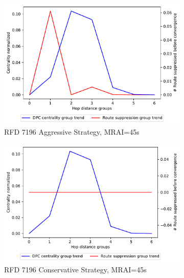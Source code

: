 \begin{figure}[H]
\begin{subfigure}[b]{0.325\textwidth}
         \centering
         \includegraphics[width=\textwidth]{images/RFD/miceVSelephants/MultiMRAI/45/mice/cisco_1000_RFD_7196_aggressive_nodeConvergence_centVSsup_trend.pdf}
         \caption{RFD 7196 Aggressive Strategy, MRAI=45s}
         \label{fig:1000_7196RFDA_centVSsup_mices}
     \end{subfigure}
     \hfill
     \begin{subfigure}[b]{0.325\textwidth}
         \centering
         \includegraphics[width=\textwidth]{images/RFD/miceVSelephants/MultiMRAI/45/mice/cisco_1000_RFD_7196_conservative_nodeConvergence_centVSsup_trend.pdf}
         \caption{RFD 7196 Conservative Strategy, MRAI=45s}
         \label{fig:1000_7196RFDC_centVSsup_mices}
     \end{subfigure}
     \vfill
     \begin{subfigure}[b]{0.325\textwidth}
         \centering

\end{subfigure}
\end{figure}
